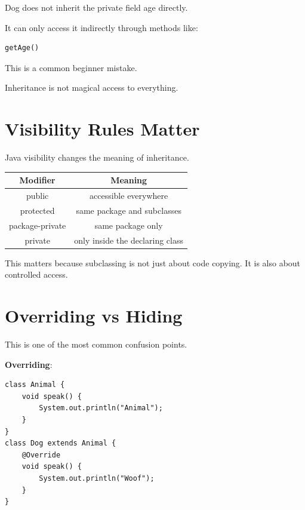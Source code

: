 \documentclass[11pt,a4paper]{book}
\begin{document}
Dog does not inherit the private field age directly.

It can only access it indirectly through methods like:

\begin{verbatim}
getAge()
\end{verbatim}


This is a common beginner mistake.

Inheritance is not magical access to everything.


\section{Visibility Rules Matter}

Java visibility changes the meaning of inheritance.


\begin{tabular}{|c|c|}
\hline
\textbf{Modifier} & \textbf{Meaning} \\
\hline
public & accessible everywhere \\
\hline
protected & same package and subclasses \\
\hline
package-private & same package only \\
\hline
private & only inside the declaring class \\
\hline
\end{tabular}


This matters because subclassing is not just about code copying.
It is also about controlled access.


\section{Overriding vs Hiding}

This is one of the most common confusion points.


\textbf{Overriding}:

\begin{verbatim}
class Animal {
    void speak() {
        System.out.println("Animal");
    }
}
class Dog extends Animal {
    @Override
    void speak() {
        System.out.println("Woof");
    }
}
\end{verbatim}
\end{document}
